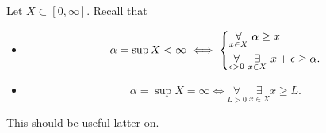\begin{prev}
	Let \(X\subset [0, \infty ]\). Recall that
	\begin{itemize}
		\item
		      \[
			      \alpha = \sup X < \infty \iff \begin{dcases}
				      \underset{x\in X}{\forall }\ \alpha \geq x \\
				      \underset{\epsilon >0}{\forall }\ \underset{x\in X}{\exists } \ x+\epsilon \geq \alpha.
			      \end{dcases}
		      \]
		\item
		      \[
			      \alpha  = \sup X = \infty \iff \underset{L>0}{\forall }\ \underset{x\in X}{\exists } x\geq L.
		      \]
	\end{itemize}
	This should be useful latter on.
\end{prev}

